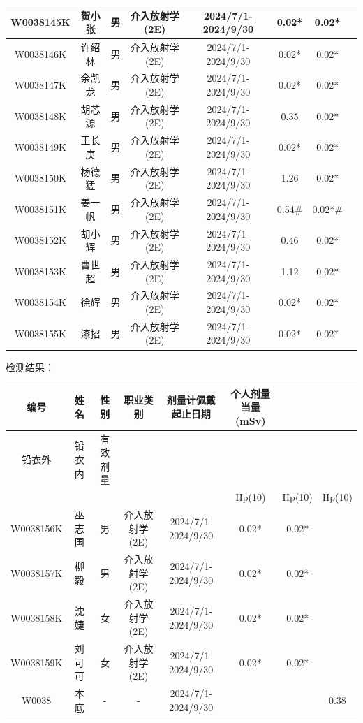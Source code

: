 \begin{table}[H]
\begin{tabular}{|c|c|c|c|c|c|c|c|}
\hline
W0038145K & 贺小张 & 男 & 介入放射学(2E) & 2024/7/1-2024/9/30 & 0.02* & 0.02* &  \\
\hline
W0038146K & 许绍林 & 男 & 介入放射学(2E) & 2024/7/1-2024/9/30 & 0.02* & 0.02* &  \\
\hline
W0038147K & 余凯龙 & 男 & 介入放射学(2E) & 2024/7/1-2024/9/30 & 0.02* & 0.02* &  \\
\hline
W0038148K & 胡芯源 & 男 & 介入放射学(2E) & 2024/7/1-2024/9/30 & 0.35 & 0.02* &  \\
\hline
W0038149K & 王长庚 & 男 & 介入放射学(2E) & 2024/7/1-2024/9/30 & 0.02* & 0.02* &  \\
\hline
W0038150K & 杨德猛 & 男 & 介入放射学(2E) & 2024/7/1-2024/9/30 & 1.26 & 0.02* &  \\
\hline
W0038151K & 姜一帆 & 男 & 介入放射学(2E) & 2024/7/1-2024/9/30 & 0.54\# & 0.02*\# &  \\
\hline
W0038152K & 胡小辉 & 男 & 介入放射学(2E) & 2024/7/1-2024/9/30 & 0.46 & 0.02* &  \\
\hline
W0038153K & 曹世超 & 男 & 介入放射学(2E) & 2024/7/1-2024/9/30 & 1.12 & 0.02* &  \\
\hline
W0038154K & 徐辉 & 男 & 介入放射学(2E) & 2024/7/1-2024/9/30 & 0.02* & 0.02* &  \\
\hline
W0038155K & 漆招 & 男 & 介入放射学(2E) & 2024/7/1-2024/9/30 & 0.02* & 0.02* &  \\
\hline
\end{tabular}
\end{table}


检测结果：


\begin{table}[H]
\centering
\begin{tabular}{|c|c|c|c|c|c|c|c|}
\hline
编号 & 姓名 & 性别 & 职业类别 & 剂量计佩戴起止日期 & 个人剂量当量(mSv) &  &  \\
\hline
铅衣外 & 铅衣内 & 有效剂量 &  &  &  &  &  \\
\hline
 &  &  &  &  & Hp(10) & Hp(10) & Hp(10) \\
\hline
W0038156K & 巫志国 & 男 & 介入放射学(2E) & 2024/7/1-2024/9/30 & 0.02* & 0.02* &  \\
\hline
W0038157K & 柳毅 & 男 & 介入放射学(2E) & 2024/7/1-2024/9/30 & 0.02* & 0.02* &  \\
\hline
W0038158K & 沈婕 & 女 & 介入放射学(2E) & 2024/7/1-2024/9/30 & 0.02* & 0.02* &  \\
\hline
W0038159K & 刘可可 & 女 & 介入放射学(2E) & 2024/7/1-2024/9/30 & 0.02* & 0.02* &  \\
\hline
W0038 & 本底 & - & - & 2024/7/1-2024/9/30 &  &  & 0.38 \\
\hline
\end{tabular}
\end{table}


